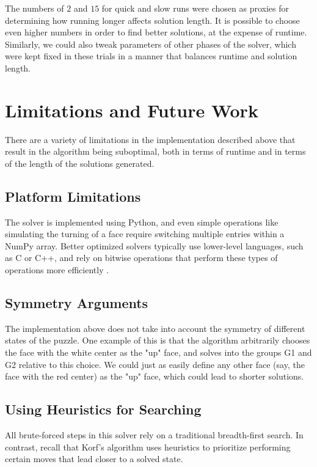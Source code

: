 \documentclass{article}
\begin{document}
The numbers of $2$ and $15$ for quick and slow runs were chosen as proxies for determining how running longer affects solution length. It is possible to choose even higher numbers in order to find better solutions, at the expense of runtime. Similarly, we could also tweak parameters of other phases of the solver, which were kept fixed in these trials in a manner that balances runtime and solution length.



\section{Limitations and Future Work}

There are a variety of limitations in the implementation described above that result in the algorithm being suboptimal, both in terms of runtime and in terms of the length of the solutions generated. %

\subsection{Platform Limitations}
The solver is implemented using Python, and even simple operations like simulating the turning of a face require switching multiple entries within a NumPy array. Better optimized solvers typically use lower-level languages, such as C or C++, and rely on bitwise operations that perform these types of operations more efficiently \cite{kociemba-coord}.

\subsection{Symmetry Arguments}
The implementation above does not take into account the symmetry of different states of the puzzle. One example of this is that the algorithm arbitrarily chooses the face with the white center as the "up" face, and solves into the groups G1 and G2 relative to this choice. We could just as easily define any other face (say, the face with the red center) as the "up" face, which could lead to shorter solutions.

\subsection{Using Heuristics for Searching}
All brute-forced steps in this solver rely on a traditional breadth-first search. In contrast, recall that Korf's algorithm uses heuristics to prioritize performing certain moves that lead closer to a solved state.
\end{document}
